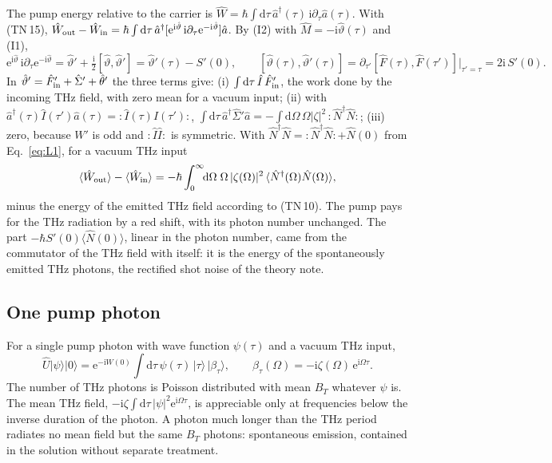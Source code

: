 \documentclass[aps,pra,onecolumn,notitlepage,11pt,amsmath,amssymb,nofootinbib]{revtex4-2}
\newcommand{\Nop}{\hat N}
\newcommand{\Iop}{\hat I}
\newcommand{\dd}{\mathrm{d}}
\newcommand{\ee}{\mathrm{e}}
\newcommand{\ii}{\mathrm{i}}
\begin{document}
The pump energy relative to the carrier is
$\hat W=\hbar\int\dd\tau\,\hat a^\dagger(\tau)\,\ii\partial_\tau\hat a(\tau)$.
With (TN\,15),
$\hat W_{\rm out}-\hat W_{\rm in}
=\hbar\int\dd\tau\,\hat a^\dagger[\ee^{\ii\hat\vartheta}\,\ii\partial_\tau\ee^{-\ii\hat\vartheta}]\hat a$.
By (I2) with $\hat M=-\ii\hat\vartheta(\tau)$ and (I1),
\begin{equation}
\ee^{\ii\hat\vartheta}\,\ii\partial_\tau\ee^{-\ii\hat\vartheta}
=\hat\vartheta'+\tfrac{\ii}{2}[\hat\vartheta,\hat\vartheta']=\hat\vartheta'(\tau)-S'(0),
\qquad
[\hat\vartheta(\tau),\hat\vartheta'(\tau)]
=\partial_{\tau'}[\hat F(\tau),\hat F(\tau')]\big|_{\tau'=\tau}=2\ii\,S'(0).
\end{equation}
In $\hat\vartheta'=\hat F_{\rm in}'+\hat\Sigma'+\hat\theta'$ the three terms
give: (i) $\int\dd\tau\,\Iop\,\hat F_{\rm in}'$, the work done by the incoming
THz field, with zero mean for a vacuum input; (ii) with
$\hat a^\dagger(\tau)\Iop(\tau')\hat a(\tau)={:}\Iop(\tau)\Iop(\tau'){:}$,
$\int\dd\tau\,\hat a^\dagger\hat\Sigma'\hat a
=-\int\dd\Omega\,\Omega|\zeta|^2\,{:}\Nop^\dagger\Nop{:}$; (iii) zero, because
$W'$ is odd and ${:}\Iop\Iop{:}$ is symmetric. With
$\Nop^\dagger\Nop={:}\Nop^\dagger\Nop{:}+\Nop(0)$ from Eq.~\eqref{eq:L1}, for a
vacuum THz input
\begin{equation}
\langle\hat W_{\rm out}\rangle-\langle\hat W_{\rm in}\rangle
=-\hbar\int_0^\infty\!\!\dd\Omega\;\Omega\,|\zeta(\Omega)|^2\,
\langle\Nop^\dagger(\Omega)\Nop(\Omega)\rangle ,
\end{equation}
minus the energy of the emitted THz field according to (TN\,10). The pump pays
for the THz radiation by a red shift, with its photon number unchanged. The
part $-\hbar S'(0)\langle\Nop(0)\rangle$, linear in the photon number, came
from the commutator of the THz field with itself: it is the energy of the
spontaneously emitted THz photons, the rectified shot noise of the theory
note.

\subsection{One pump photon}

For a single pump photon with wave function $\psi(\tau)$ and a vacuum THz
input,
\begin{equation}
\hat U|\psi\rangle|0\rangle=\ee^{-\ii W(0)}\int\!\dd\tau\,\psi(\tau)\,|\tau\rangle\,|\beta_\tau\rangle,
\qquad\beta_\tau(\Omega)=-\ii\zeta(\Omega)\,\ee^{\ii\Omega\tau}.
\end{equation}
The number of THz photons is Poisson distributed with mean $B_T$ whatever
$\psi$ is. The mean THz field,
$-\ii\zeta\int\dd\tau\,|\psi|^2\ee^{\ii\Omega\tau}$, is appreciable only at
frequencies below the inverse duration of the photon. A photon much longer
than the THz period radiates no mean field but the same $B_T$ photons:
spontaneous emission, contained in the solution without separate treatment.
\end{document}

